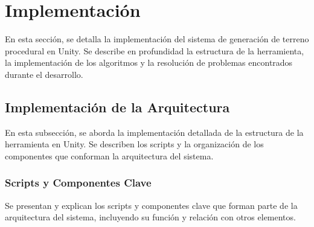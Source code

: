 \section{Implementación}

En esta sección, se detalla la implementación del sistema de generación de terreno procedural en Unity. Se describe en profundidad la estructura de la herramienta, la implementación de los algoritmos y la resolución de problemas encontrados durante el desarrollo.

\subsection{Implementación de la Arquitectura}

En esta subsección, se aborda la implementación detallada de la estructura de la herramienta en Unity. Se describen los scripts y la organización de los componentes que conforman la arquitectura del sistema.

\subsubsection{Scripts y Componentes Clave}

Se presentan y explican los scripts y componentes clave que forman parte de la arquitectura del sistema, incluyendo su función y relación con otros elementos.

